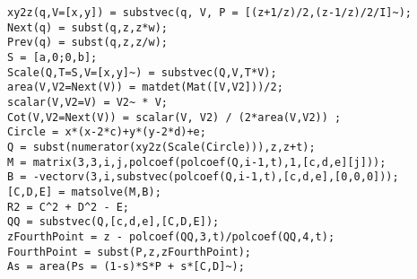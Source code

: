 \documentclass{article}
\begin{document}
\begin{verbatim}
xy2z(q,V=[x,y]) = substvec(q, V, P = [(z+1/z)/2,(z-1/z)/2/I]~);
Next(q) = subst(q,z,z*w);
Prev(q) = subst(q,z,z/w);
S = [a,0;0,b];
Scale(Q,T=S,V=[x,y]~) = substvec(Q,V,T*V);
area(V,V2=Next(V)) = matdet(Mat([V,V2]))/2;
scalar(V,V2=V) = V2~ * V;
Cot(V,V2=Next(V)) = scalar(V, V2) / (2*area(V,V2)) ;
Circle = x*(x-2*c)+y*(y-2*d)+e;
Q = subst(numerator(xy2z(Scale(Circle))),z,z+t);
M = matrix(3,3,i,j,polcoef(polcoef(Q,i-1,t),1,[c,d,e][j]));
B = -vectorv(3,i,substvec(polcoef(Q,i-1,t),[c,d,e],[0,0,0]));
[C,D,E] = matsolve(M,B);
R2 = C^2 + D^2 - E;
QQ = substvec(Q,[c,d,e],[C,D,E]);
zFourthPoint = z - polcoef(QQ,3,t)/polcoef(QQ,4,t);
FourthPoint = subst(P,z,zFourthPoint);
As = area(Ps = (1-s)*S*P + s*[C,D]~);
\end{verbatim}
\end{document}
